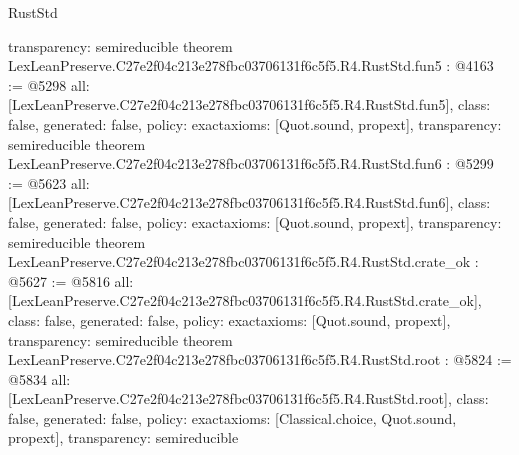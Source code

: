 \begin{lexlean}{RustStd}
\begin{coremodule}
{  transparency: semireducible
}
theorem LexLeanPreserve.C27e2f04c213e278fbc03706131f6c5f5.R4.RustStd.fun5 : @4163 := @5298 {
  all: [LexLeanPreserve.C27e2f04c213e278fbc03706131f6c5f5.R4.RustStd.fun5],
  class: false,
  generated: false,
  policy: exact{axioms: [Quot.sound, propext]},
  transparency: semireducible
}
theorem LexLeanPreserve.C27e2f04c213e278fbc03706131f6c5f5.R4.RustStd.fun6 : @5299 := @5623 {
  all: [LexLeanPreserve.C27e2f04c213e278fbc03706131f6c5f5.R4.RustStd.fun6],
  class: false,
  generated: false,
  policy: exact{axioms: [Quot.sound, propext]},
  transparency: semireducible
}
theorem LexLeanPreserve.C27e2f04c213e278fbc03706131f6c5f5.R4.RustStd.crate_ok : @5627 := @5816 {
  all: [LexLeanPreserve.C27e2f04c213e278fbc03706131f6c5f5.R4.RustStd.crate_ok],
  class: false,
  generated: false,
  policy: exact{axioms: [Quot.sound, propext]},
  transparency: semireducible
}
theorem LexLeanPreserve.C27e2f04c213e278fbc03706131f6c5f5.R4.RustStd.root : @5824 := @5834 {
  all: [LexLeanPreserve.C27e2f04c213e278fbc03706131f6c5f5.R4.RustStd.root],
  class: false,
  generated: false,
  policy: exact{axioms: [Classical.choice, Quot.sound, propext]},
  transparency: semireducible
}


\end{coremodule}
\end{lexlean}

